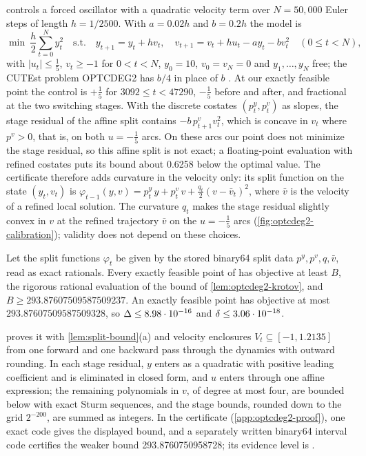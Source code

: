  controls a forced oscillator with a quadratic velocity term over $N=50{,}000$ Euler steps of length $h=1/2500$.
With $a=0.02h$ and $b=0.2h$ the model is
\[
  \min\ \frac h2\sum_{t=0}^Ny_t^2\quad\text{s.t.}\quad y_{t+1}=y_t+hv_t,\quad v_{t+1}=v_t+hu_t-ay_t-bv_t^2\quad(0\le t<N),
\]
with $|u_t|\le\frac15$, $v_t\ge-1$ for $0<t<N$, $y_0=10$, $v_0=v_N=0$ and $y_1,\dots,y_N$ free; the CUTEst problem OPTCDEG2 has $b/4$ in place of $b$ \citep{luksan2026-cutest-source-forms-for-dtoc5}.
At our exactly feasible point the control is $+\frac15$ for $3092\le t<47290$, $-\frac15$ before and after, and fractional at the two switching stages.
With the discrete costates $(p^y_t,p^v_t)$ as slopes, the stage residual of the affine split contains $-b\,p^v_{t+1}v_t^2$, which is concave in $v_t$ where $p^v>0$, that is, on both $u=-\frac15$ arcs.
On these arcs our point does not minimize the stage residual, so this affine split is not exact; a floating-point evaluation with refined costates puts its bound about 0.6258 below the optimal value.
The certificate therefore adds curvature in the velocity only: its split function on the state $(y_t,v_t)$ is $\varphi_{t-1}(y,v)=p^y_t\,y+p^v_t\,v+\frac{q_t}{2}(v-\bar v_t)^2$, where $\bar v$ is the velocity of a refined local solution.
The curvature $q_t$ makes the stage residual slightly convex in $v$ at the refined trajectory $\bar v$ on the $u=-\frac15$ arcs (\cref{fig:optcdeg2-calibration}); validity does not depend on these choices.

\begin{theorem}\label{thm:optcdeg2-bound}
Let the split functions $\varphi_t$ be given by the stored binary64 split data $p^y,p^v,q,\bar v$, read as exact rationals.
Every exactly feasible point of  has objective at least $B$, the rigorous rational evaluation of the bound of \cref{lem:optcdeg2-krotov}, and $B\ge293.87607509587509237$.
An exactly feasible point has objective at most $293.87607509587509328$, so $\Delta\le8.98\cdot 10^{-16}$ and $\delta\le3.06\cdot 10^{-18}$.
\end{theorem}

 proves it with \cref{lem:split-bound}(a) and velocity enclosures $V_t\subseteq[-1,1.2135]$ from one forward and one backward pass through the dynamics with outward rounding.
In each stage residual, $y$ enters as a quadratic with positive leading coefficient and is eliminated in closed form, and $u$ enters through one affine expression; the remaining polynomials in $v$, of degree at most four, are bounded below with exact Sturm sequences, and the stage bounds, rounded down to the grid $2^{-200}$, are summed as integers.
In the certificate (\cref{app:optcdeg2-proof}), one exact code  gives the displayed bound, and a separately written binary64 interval code certifies the weaker bound 293.8760750958728; its evidence level is .


